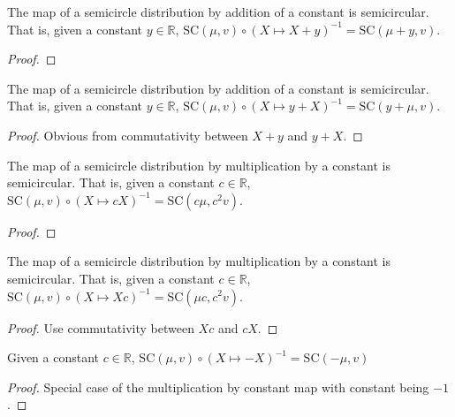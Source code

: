 
\begin{lemma}\label{lem:semicircleReal_map_add_const}
  \notready
  The map of a semicircle distribution by addition of a constant is semicircular. That is,
  given a constant $y \in \mathbb{R}$, $ \mathrm{SC}(\mu, v) \circ (X \mapsto X + y )^{-1} = \mathrm{SC}(\mu + y, v)$.
  \begin{proof}
  \end{proof}
\end{lemma}


\begin{lemma}\label{lem:semicircleReal_map_const_add}
  \mathlibok
  The map of a semicircle distribution by addition of a constant is semicircular. That is,
  given a constant $y \in \mathbb{R}$, $ \mathrm{SC}(\mu, v) \circ (X \mapsto y + X )^{-1} = \mathrm{SC}(y + \mu, v)$.
  \begin{proof}
    Obvious from commutativity between $X + y$ and $y + X$.
  \end{proof}
\end{lemma}


\begin{lemma}\label{lem:semicircleReal_map_const_mul}
  \notready
    The map of a semicircle distribution by multiplication by a constant is semicircular. That is,
  given a constant $c \in \mathbb{R}$, $ \mathrm{SC}(\mu, v) \circ (X \mapsto cX )^{-1} = \mathrm{SC}(c\mu , c^2v)$.
  \begin{proof}
  \end{proof}
\end{lemma}



\begin{lemma}\label{lem:semicircleReal_map_mul_const}
  \mathlibok
   The map of a semicircle distribution by multiplication by a constant is semicircular. That is,
  given a constant $c \in \mathbb{R}$, $ \mathrm{SC}(\mu, v) \circ (X \mapsto Xc )^{-1} = \mathrm{SC}(\mu c , c^2v)$.
  \begin{proof}
    Use commutativity between $Xc$ and $cX$.
  \end{proof}
\end{lemma}



\begin{lemma}\label{lem:semicircleReal_map_neg}
  \mathlibok
  Given a constant $c \in \mathbb{R}$, $ \mathrm{SC}(\mu, v) \circ (X \mapsto -X )^{-1} = \mathrm{SC}(-\mu  , v)$
  \begin{proof}
     Special case of the multiplication by constant map with constant being $-1$.
  \end{proof}
\end{lemma}

